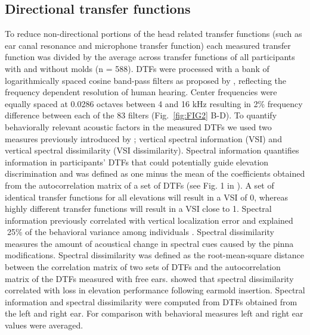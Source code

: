 \documentclass[preprint]{JASA}
\begin{document}
\subsection{Directional transfer functions}
To reduce non-directional portions of the head related transfer functions (such as ear canal resonance and microphone transfer function) each measured transfer function was divided by the average across transfer functions of all participants with and without molds (n = 588). DTFs were processed with a bank of logarithmically spaced cosine band-pass filters as proposed by \citet{middlebrooks_individual_1999}, reflecting the frequency dependent resolution of human hearing. Center frequencies were equally spaced at 0.0286 octaves between 4 and 16 kHz resulting in 2\% frequency difference between each of the 83 filters (Fig.~\ref{fig:FIG2} B-D). To quantify behaviorally relevant acoustic factors in the measured DTFs we used two measures previously introduced by \citet{trapeau_fast_2016}; vertical spectral information (VSI) and vertical spectral dissimilarity (VSI dissimilarity). Spectral information quantifies information in participants’ DTFs that could potentially guide elevation discrimination and was defined as one minus the mean of the coefficients obtained from the autocorrelation matrix of a set of DTFs (see Fig. 1 in \citet{trapeau_fast_2016}). A set of identical transfer functions for all elevations will result in a VSI of 0, whereas highly different transfer functions will result in a VSI close to 1. Spectral information previously correlated with vertical localization error and explained 25\% of the behavioral variance among individuals \citep{trapeau_fast_2016}. Spectral dissimilarity measures the amount of acoustical change in spectral cues caused by the pinna modifications. Spectral dissimilarity was defined as the root-mean-square distance between the correlation matrix of two sets of DTFs and the autocorrelation matrix of the DTFs measured with free ears. \citet{trapeau_fast_2016} showed that spectral dissimilarity correlated with loss in elevation performance following earmold insertion. Spectral information and spectral dissimilarity were computed from DTFs obtained from the left and right ear. For comparison with behavioral measures left and right ear values were averaged.
\end{document}

